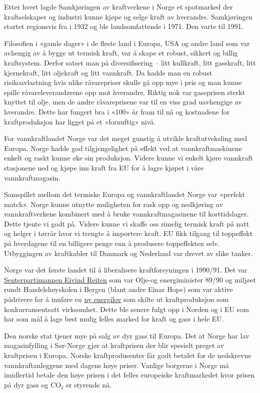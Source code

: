 \documentclass[
]{book}
\begin{document}
Etter hvert lagde Samkjøringen av kraftverkene i Norge et spotmarked der kraftselskaper og industri kunne kjøpe og selge kraft av hverandre. Samkjøringen startet regionsvis fra i 1932 og ble landsomfattende i 1971. Den varte til 1991.

Filosofien i «gamle dager» i de fleste land i Europa, USA og andre land som var avhengig av å bygge ut termisk kraft, var å skape et robust, sikkert og billig kraftsystem. Derfor satset man på diversifisering -- litt kullkraft, litt gasskraft, litt kjernekraft, litt oljekraft og litt vannkraft. Da hadde man en robust risikoavlastning hvis ulike råvarepriser skulle gå opp mye i pris og man kunne spille råvareleverandørene opp mot hverandre. Riktig nok var gassprisen sterkt knyttet til olje, men de andre råvareprisene var til en viss grad uavhengige av hverandre. Dette har fungert bra i «100» år fram til nå og kostnadene for kraftproduksjon har ligget på et «fornuftig» nivå.

For vannkraftlandet Norge var det meget gunstig å utvikle kraftutveksling med Europa. Norge hadde god tilgjengelighet på effekt ved at vannkraftmaskinene enkelt og raskt kunne øke sin produksjon. Videre kunne vi enkelt kjøre vannkraft stasjonene ned og kjøpe inn kraft fra EU for å lagre kjøpet i våre vannkraftmagasin.

Samspillet mellom det termiske Europa og vannkraftlandet Norge var «perfekt match». Norge kunne utnytte muligheten for rask opp og nedkjøring av vannkraftverkene kombinert med å bruke vannkraftmagasinene til korttidslager. Dette tjente vi godt på. Videre kunne vi skaffe oss rimelig termisk kraft på natt og helger i tørrår hvor vi trengte å importere kraft. EU fikk tilgang til toppeffekt på hverdagene til en billigere penge enn å produsere toppeffekten selv. Utbyggingen av kraftkabler til Danmark og Nederland var drevet av slike tanker.

Norge var det første landet til å liberalisere kraftforsyningen i 1990/91. Det var \href{https://no.wikipedia.org/wiki/Eivind_Reiten}{Senterpartimannen Eivind Reiten} som var Olje-og energiminister 89/90 og miljøet rundt Handelshøyskolen i Bergen (blant andre Einar Hope) som var aktive pådrivere for å innføre en \href{https://no.wikipedia.org/wiki/Energiloven}{ny energilov} som skilte ut kraftproduksjon som konkurranseutsatt virksomhet. Dette ble senere fulgt opp i Norden og i EU som har som mål å lage best mulig felles marked for kraft og gass i hele EU.

Den norske stat tjener mye på salg av dyr gass til Europa. Det at Norge har lav magasinfylling i Sør-Norge gjør at kraftprisen der blir spesielt preget av kraftprisen i Europa. Norske kraftprodusenter får godt betalet for de nedskrevne vannkraftanleggene med dagens høye priser. Vanlige borgerne i Norge må imidlertid betale den høye prisen i det felles europeiske kraftmarkedet hvor prisen på dyr gass og CO₂ er styrende nå.
\end{document}
